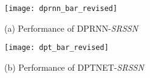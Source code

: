 \begin{figure*}
  \centering
  \begin{minipage}[b]{0.48\linewidth}
    \centering
    \texttt{[image: dprnn\_bar\_revised]}
    \centerline{(a) Performance of DPRNN-\emph{SRSSN}}\medskip
  \end{minipage}
  \hspace{0.01\linewidth}
  \begin{minipage}[b]{0.48\linewidth}
    \centering
    \texttt{[image: dpt\_bar\_revised]}
    \centerline{(b) Performance of DPTNET-\emph{SRSSN}}\medskip
  \end{minipage}
  \caption{}
  \label{fig:ablation_groups}
\end{figure*}

\begin{comment}
\begin{table*}
\centering
  \caption{Performance of eight variants of our SRSSN in terms of SI-SNR (dB) and SDR (dB) for ablation study. }
\label{tab:ablation}
  \setlength{\tabcolsep}{1.2pt} \begin{tabular}
  {l p{7em}<{\centering} p{10em}<{\centering} p{6em}<{\centering} p{5em}<{\centering} p{5em}<{\centering} p{5em}<{\centering} p{5em}<{\centering}}
  \toprule
  \multirow{2}{*}{\centering Method} & Space order & Parameters of encoder & \multirow{2}{*}{\centering Model size} & \multicolumn{2}{c}{DPRNN} & \multicolumn{2}{c}{DPTNET} \\
  & ( \& ) & ( \& ) & & SI-SNR & SDR & SI-SNR & SDR\\
  \midrule
  \midrule
  \textbf{Base model} & low \& - & 4k \& - & - & 17.8 & 18.1 & 18.3 & 18.6 \\
  \midrule
  \textbf{Base model-expanded} & low \& - & 16k \& - & - & 17.8 & 18.1 & 18.2 & 18.5 \\
  \midrule
  \textbf{Iterative} & low \& low & 4k \& 4k & - & 18.3 & 18.5 & 19.2 & 19.5 \\ 
  \midrule
  \textbf{High-order} & high \& - & - \& - & - & 19.1 & 19.3 & 19.0 & 19.2 \\
  \midrule
  \textbf{SRSSN-1D} & low \& low & 4k \& 131k & - & 19.3 & 19.5 & 19.7 & 19.9 \\
  \midrule
  \textbf{SRSSN-1D-expanded} & low \& low & 4k \& 524k & - & 19.5 & 19.7 & 20.0 & 20.2 \\
  \midrule
  \textbf{SRSSN-} & high \& high & 4k \& 32k  & - & 18.1 & 18.3 & 18.7 & 18.9 \\ 
  \midrule
  \textbf{SRSSN} & high \& high & 4k \& 32k & - & 20.0 & 20.2 & 20.4 & 20.6 \\ 
  \midrule
  \end{tabular} 
\end{table*}
\end{comment}

